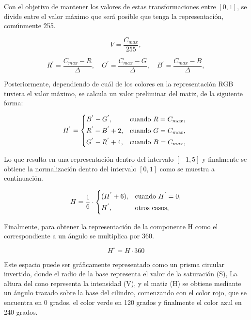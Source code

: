 Con el objetivo de mantener los valores de estas transformaciones entre $[0,1]$, se divide entre el valor máximo que será posible que tenga la representación, comúnmente 255.

\begin{equation}
V = \frac{C_{max}}{255},
\label{eqn:Value}
\end{equation}

\begin{equation}
R^{'} = \frac{C_{max}-R}{\Delta},  \quad G^{'} = \frac{C_{max}-G}{\Delta},  \quad B^{'} = \frac{C_{max}-B}{\Delta},
\label{eqn:R_prima}
\end{equation}

Posteriormente, dependiendo de cuál de los colores en la representación RGB tuviera el valor máximo, se calcula un valor preliminar del matiz, de la siguiente forma:

\begin{equation}
    H^{'} = \begin{cases*}
  B^{'} - G^{'}, & cuando $R = C_{max}$,\\
  R^{'} - B^{'}+2, & cuando $G = C_{max}$,\\
  G^{'} - R^{'}+4, & cuando $B = C_{max}$,
    \end{cases*}
\label{eqn:H_prima}
\end{equation}

Lo que resulta en una representación dentro del intervalo $[-1,5]$ y finalmente se obtiene la normalización dentro del intervalo $[0,1]$ como se muestra a continuación.

\begin{equation}
    H = \frac{1}{6}\cdot\begin{cases*}
  (H^{'}+6), & cuando $H^{'}=0$,\\
  H^{'}, & otros casos,
    \end{cases*}
    \label{eqn:H_normalizada}
\end{equation}

Finalmente, para obtener la representación de la componente H como el correspondiente a un ángulo se multiplica por 360.

\begin{equation}
    H^{\circ} = H\cdot360
    \label{eqn:H_degrees}
\end{equation}

Este espacio puede ser gráficamente representado como un prisma circular invertido, donde el radio de la base representa el valor de la saturación (S), La altura del cono representa la intensidad (V), y el matiz (H) se obtiene mediante un ángulo trazado sobre la base del cilindro, comenzando con el color rojo, que se encuentra en 0 grados, el color verde en 120 grados y finalmente el color azul en 240 grados. 


